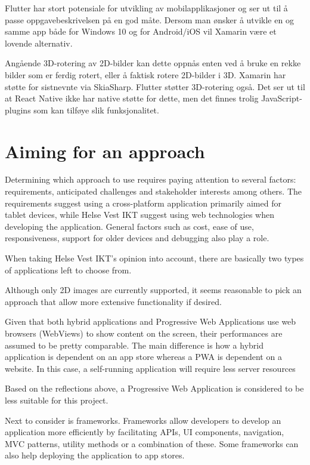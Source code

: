 Flutter har stort potensiale for utvikling av mobilapplikasjoner og ser ut til å passe oppgavebeskrivelsen på en god måte. Dersom man ønsker å utvikle en og samme app både for Windows 10 og for Android/iOS vil Xamarin være et lovende alternativ.

Angående 3D-rotering av 2D-bilder kan dette oppnås enten ved å bruke en rekke bilder som er ferdig rotert, eller å faktisk rotere 2D-bilder i 3D. Xamarin har støtte for sistnevnte via SkiaSharp. Flutter støtter 3D-rotering også. Det ser ut til at React Native ikke har native støtte for dette, men det finnes trolig JavaScript-plugins som kan tilføye slik funksjonalitet.

\section{Aiming for an approach}

Determining which approach to use requires paying attention to several factors: requirements, anticipated challenges and stakeholder interests among others. The requirements suggest using a cross-platform application primarily aimed for tablet devices, while Helse Vest IKT suggest using web technologies when developing the application. General factors such as cost, ease of use, responsiveness, support for older devices and debugging also play a role.

When taking Helse Vest IKT's opinion into account, there are basically two types of applications left to choose from. 

Although only 2D images are currently supported, it seems reasonable to pick an approach that allow more extensive functionality if desired.

Given that both hybrid applications and Progressive Web Applications use web browsers (WebViews) to show content on the screen, their performances are assumed to be pretty comparable. The main difference is how a hybrid application is dependent on an app store whereas a PWA is dependent on a website. In this case, a self-running application will require less server resources

Based on the reflections above, a Progressive Web Application is considered to be less suitable for this project.

Next to consider is frameworks. Frameworks allow developers to develop an application more efficiently by facilitating APIs, UI components, navigation, MVC patterns, utility methods or a combination of these. Some frameworks can also help deploying the application to app stores.

